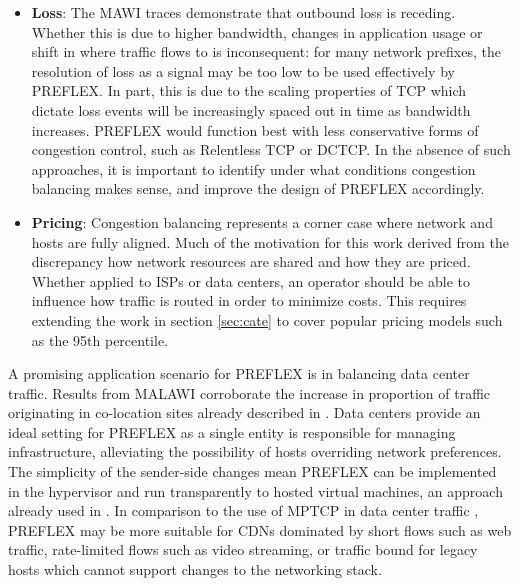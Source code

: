 \begin{itemize}
\item{
    \textbf{Loss}: The \ac{MAWI} traces demonstrate that outbound loss is receding.
    Whether this is due to higher bandwidth, changes in application usage or shift in where traffic flows to is inconsequent: for many network prefixes, the resolution of loss as a signal may be too low to be used effectively by \ac{PREFLEX}.
    In part, this is due to the scaling properties of \ac{TCP} which dictate loss events will be increasingly spaced out in time as bandwidth increases.
    \ac{PREFLEX} would function best with less conservative forms of congestion control, such as Relentless \ac{TCP} or \ac{DCTCP}.
    In the absence of such approaches, it is important to identify under what conditions congestion balancing makes sense, and improve the design of \ac{PREFLEX} accordingly.
}

\item{
    \textbf{Pricing}: Congestion balancing represents a corner case where network and hosts are fully aligned. 
    Much of the motivation for this work derived from the discrepancy how network resources are shared and how they are priced.
    Whether applied to \acp{ISP} or data centers, an operator should be able to influence how traffic is routed in order to minimize costs.
    This requires extending the work in section \ref{sec:cate} to cover popular pricing models such as the 95th percentile.
}
\end{itemize}

A promising application scenario for \ac{PREFLEX} is in balancing data center traffic.
Results from \ac{MALAWI} corroborate the increase in proportion of traffic originating in co-location sites already described in \cite{Labovitz:2010p175}.
Data centers provide an ideal setting for \ac{PREFLEX} as a single entity is responsible for managing infrastructure, alleviating the possibility of hosts overriding network preferences.
The simplicity of the sender-side changes mean \ac{PREFLEX} can be implemented in the hypervisor and run transparently to hosted virtual machines, an approach already used in \cite{Wu:2010p556}.
In comparison to the use of \ac{MPTCP} in data center traffic \cite{Raiciu:2011p539}, \ac{PREFLEX} may be more suitable for \acp{CDN} dominated by short flows such as web traffic, rate-limited flows such as video streaming, or traffic bound for legacy hosts which cannot support changes to the networking stack.





